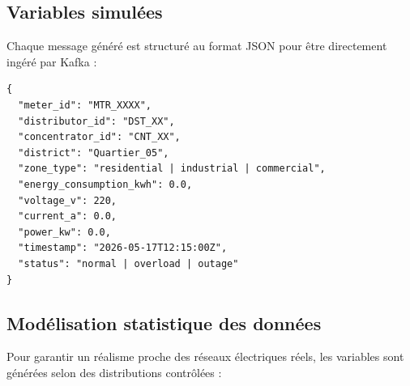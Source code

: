 \documentclass[12pt,a4paper]{report}
\begin{document}
\subsection{Variables simulées}
Chaque message généré est structuré au format JSON pour être directement ingéré par Kafka :

\begin{verbatim}
{
  "meter_id": "MTR_XXXX",
  "distributor_id": "DST_XX",
  "concentrator_id": "CNT_XX",
  "district": "Quartier_05",
  "zone_type": "residential | industrial | commercial",
  "energy_consumption_kwh": 0.0,
  "voltage_v": 220,
  "current_a": 0.0,
  "power_kw": 0.0,
  "timestamp": "2026-05-17T12:15:00Z",
  "status": "normal | overload | outage"
}
\end{verbatim}

\subsection{Modélisation statistique des données}
Pour garantir un réalisme proche des réseaux électriques réels, les variables sont générées selon des distributions contrôlées :
\end{document}
